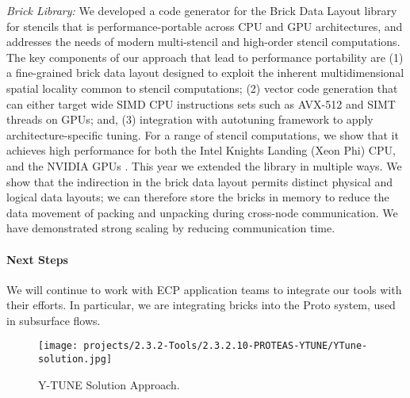 \vspace*{.1in}
\noindent
\textit{Brick Library:}
We developed a code generator for the Brick Data Layout library for stencils
that is performance-portable across CPU and GPU architectures, and addresses the
needs of modern multi-stencil and high-order stencil computations. The key
components of our approach that lead to performance portability are (1) a
fine-grained brick data layout designed to exploit the inherent multidimensional
spatial locality common to stencil computations; (2) vector code generation that
can either target wide SIMD CPU instructions sets such as AVX-512 and SIMT
threads on GPUs; and, (3) integration with autotuning framework to apply
architecture-specific tuning. For a range of stencil computations, we show that
it achieves high performance for both the Intel Knights Landing (Xeon Phi) CPU,
and the NVIDIA GPUs \cite{P3HPC_Bricks,zhao2019}. This year we extended the library in multiple ways.
We show that the indirection in the brick data layout permits distinct physical and logical data layouts; we can
therefore store the bricks in memory to reduce the data movement of packing and unpacking during cross-node
communication.  We have demonstrated strong scaling by reducing communication time.  

\paragraph{Next Steps}
We will continue to work with ECP application teams to integrate our tools with their efforts.  In particular,
we are integrating bricks into the Proto system, used in subsurface flows.

\begin{figure}[h]
\begin{center}
\texttt{[image: projects/2.3.2-Tools/2.3.2.10-PROTEAS-YTUNE/YTune-solution.jpg]}
\end{center}
\caption{Y-TUNE Solution Approach.}
\end{figure}

%